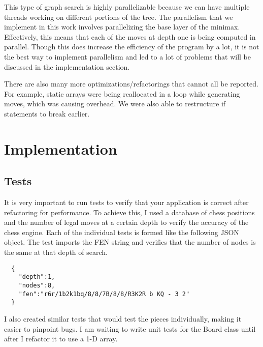 \documentclass[sigconf]{acmart}
\begin{document}
This type of graph search is highly parallelizable because we can have multiple threads working on different portions of the tree.
The parallelism that we implement in this work involves parallelizing the base layer of the minimax.
Effectively, this means that each of the moves at depth one is being computed in parallel. Though this does increase the efficiency of the program by a lot, it is not the best way to implement parallelism and led to a lot of problems that will be discussed in the implementation section.

There are also many more optimizations/refactorings that cannot all be reported.
For example, static arrays were being reallocated in a loop while generating moves, which was causing overhead.
We were also able to restructure if statements to break earlier.

\section{Implementation}
\subsection{Tests}
It is very important to run tests to verify that your application is correct after refactoring for performance.
To achieve this, I used a database of chess positions \cite{jones} and the number of legal moves at a certain depth to verify the accuracy of the chess engine.
Each of the individual tests is formed like the following JSON object. The test imports the FEN \cite{fen} string and verifies that the number of nodes is the same at that depth of search.
\begin{verbatim}
  {
    "depth":1,
    "nodes":8,
    "fen":"r6r/1b2k1bq/8/8/7B/8/8/R3K2R b KQ - 3 2"
  }
\end{verbatim}
I also created similar tests that would test the pieces individually, making it easier to pinpoint bugs.
I am waiting to write unit tests for the Board class until after I refactor it to use a 1-D array.
\end{document}
